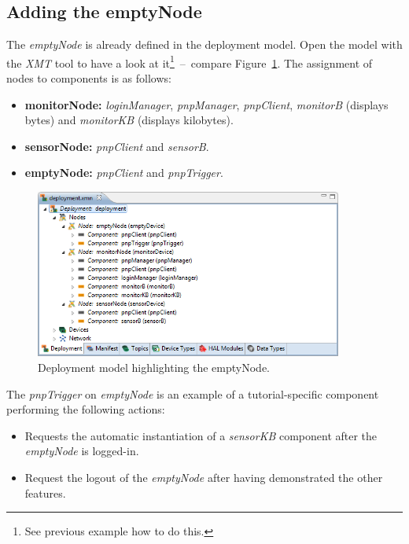 \subsection{Adding the emptyNode}

The \emph{emptyNode} is already defined in the deployment model.
Open the model with the \emph{XMT} tool to have a look at it\footnote{See previous example how to do this.}~--~compare Figure~\ref{fig:pnp_deployment}.
The assignment of nodes to components is as follows:
\begin{itemize}
	\item[] \textbf{monitorNode:} \emph{loginManager}, \emph{pnpManager}, \emph{pnpClient}, \emph{monitorB} (displays bytes) and \emph{monitorKB} (displays kilobytes).
	\item[] \textbf{sensorNode:} \emph{pnpClient} and \emph{sensorB}.
	\item[] \textbf{emptyNode:} \emph{pnpClient} and \emph{pnpTrigger}.
\end{itemize}

\begin{figure}[htpb]
	\centering
	\includegraphics[width=0.9\textwidth]{figures/pnp_deployment.png}
	\caption{Deployment model highlighting the emptyNode.}
	\label{fig:pnp_deployment}
\end{figure}

The \emph{pnpTrigger} on \emph{emptyNode} is an example of a tutorial-specific component performing the following actions:
\begin{itemize}
	\item[] Requests the automatic instantiation of a \emph{sensorKB} component after the \emph{emptyNode} is logged-in.
	\item[] Request the logout of the \emph{emptyNode} after having demonstrated the other features. 
\end{itemize}


